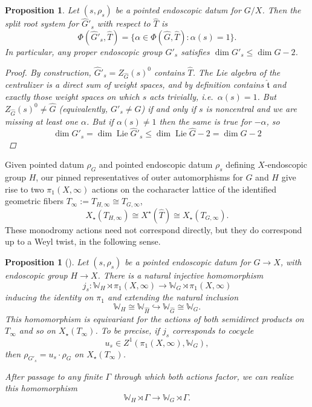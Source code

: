 \documentclass[openany]{amsbook}
\newtheorem{proposition}[theorem]{Proposition}
\theoremstyle{definition}
\theoremstyle{remark}
\numberwithin{equation}{section}
\newcommand{\W}{\mathbb{W}}
\renewcommand{\-}{\operatorname{-}}
\newcommand{\on}[1]{\operatorname{#1}}
\newcommand{\Lie}{\on{Lie}}
\begin{document}
\begin{proposition}\label{prop.end.gp.sub.root.system}
    Let $(s, \rho_s)$ be a pointed endoscopic datum for $G/X$. Then the split root system for $\widehat{G}'_s$ with respect to $\widehat{T}$ is 
    $$
        \Phi(\widehat{G}'_s, \widehat{T}) = \{\alpha \in \Phi(\widehat{G}, \widehat{T}) : \alpha(s) = 1\}.
    $$
    In particular, any proper endoscopic group $G'_s$ satisfies $\dim G'_s \le \dim G - 2$.
    \begin{proof}
        By construction, $\widehat{G}'_s = Z_{\widehat{G}}(s)^0$ contains $\widehat{T}$. The Lie algebra of the centralizer is a direct sum of weight spaces, and by definition contains $\widehat{\mathfrak{t}}$ and exactly those weight spaces on which $s$ acts trivially, i.e.\ $\alpha(s) = 1$. But $Z_{\widehat{G}}(s)^0 \neq \widehat{G}$ (equivalently, $G'_s \neq G$) if and only if $s$ is noncentral and we are missing at least one $\alpha$. But if $\alpha(s) \neq 1$ then the same is true for $-\alpha$, so 
        $$\dim G'_s = \dim \Lie \widehat{G}'_s \le \dim \Lie \widehat{G} - 2 = \dim G - 2$$
    \end{proof}
\end{proposition}

Given pointed datum $\rho_G$ and pointed endoscopic datum $\rho_s$ defining $X$-endoscopic group $H$, our pinned representatives of outer automorphisms for $G$ and $H$ give rise to two $\pi_1(X, \infty)$ actions on the cocharacter lattice of the identified geometric fibers $T_\infty := T_{H, \infty} \cong T_{G, \infty}$,
$$
    X_\star(T_{H, \infty}) \cong X^\star(\widehat{T}) \cong X_\star(T_{G, \infty}).
$$
These monodromy actions need not correspond directly, but they do correspond up to a Weyl twist, in the following sense.

\begin{proposition}[{\cite[\S 1.9, 1.10]{ngofl}}]\label{prop.Weyl.functor.endo.gps}
    Let $(s, \rho_s)$ be a pointed endoscopic datum for $G \to X$, with endoscopic group $H \to X$.  There is a natural injective homomorphism $$j_s : \W_H \rtimes \pi_1(X, \infty) \to \W_G \rtimes \pi_1(X, \infty)$$ inducing the identity on $\pi_1$ and extending the natural inclusion $$\W_{H} \cong \W_{\widehat{H}} \hookrightarrow \W_{\widehat{G}} \cong \W_G.$$ 
    This homomorphism is equivariant for the actions of both semidirect products on $T_\infty$ and so on $X_{\star}(T_\infty)$. To be precise, if $j_s$ corresponds to cocycle
    $$
        u_s \in Z^1(\pi_1(X, \infty), \W_G),
    $$
    then $\rho_{G'_s} = u_s \cdot \rho_G$ on $X_{\star}(T_\infty)$.

    After passage to any finite $\Gamma$ through which both actions factor, we can realize this homomorphism
    $$
        \W_H \rtimes \Gamma \to \W_G \rtimes \Gamma.
    $$
\end{proposition}
\end{document}
